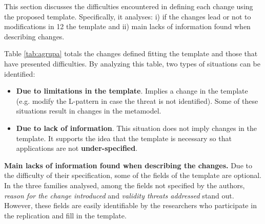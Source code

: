 This section discusses the difficulties encountered in defining each change using the proposed template. Specifically, it analyses: i) if the changes lead or not to modifications in
12
 the template and ii) main lacks of information found when describing changes.
%
 
%
%
%


Table \ref{tab:agrupa} totals the changes defined fitting the template and those that have presented difficulties.
By analyzing this table, two types of situations can be identified:
\begin{itemize}
\item \textbf{Due to limitations in the template}. Implies a change in the template (e.g. modify the L-pattern in case the threat is not identified). Some of these situations result in changes in the metamodel.
\item  \textbf{Due to lack of information}. This situation does not imply changes in the template.  It supports the idea that the template is necessary so that applications are not \textbf{under-specified}.

\end{itemize}
\textbf{Main lacks of information found when describing the changes.}  
Due to the difficulty of their specification, some of the fields of the template are optional.  In the three families analysed, among the fields not specified by the authors, \emph{reason for the change introduced} and \emph{validity threats addressed} stand out.   
However, these fields are easily identifiable by the researchers who participate in the replication and fill in the template.

